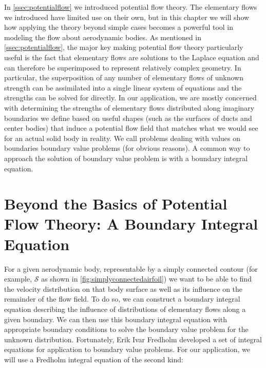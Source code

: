 
In \cref{ssec:potentialflow} we introduced potential flow theory.
%
The elementary flows we introduced have limited use on their own, but in this chapter we will show how applying the theory beyond simple cases becomes a powerful tool in modeling the flow about aerodynamic bodies.
%
As mentioned in \cref{ssec:potentialflow}, the major key making potential flow theory particularly useful is the fact that elementary flows are solutions to the Laplace equation and can therefore be superimposed to represent relatively complex geometry.
%
In particular, the superposition of any number of elementary flows of unknown strength can be assimilated into a single linear system of equations and the strengths can be solved for directly.
%
In our application, we are mostly concerned with determining the strengths of elementary flows distributed along imaginary boundaries we define based on useful shapes (such as the surfaces of ducts and center bodies) that induce a potential flow field that matches what we would see for an actual solid body in reality.
%
We call problems dealing with values on boundaries boundary value problems (for obvious reasons).
%
A common way to approach the solution of boundary value problem is with a boundary integral equation.

\section{Beyond the Basics of Potential Flow Theory: A Boundary Integral Equation}

For a given aerodynamic body, representable by a simply connected contour (for example, \(\mathcal{S}\) as shown in \cref{fig:simplyconnectedairfoil}) we want to be able to find the velocity distribution on that body surface as well as its influence on the remainder of the flow field.
%
To do so, we can construct a boundary integral equation describing the influence of distributions of elementary flows along a given boundary.
%
We can then use this boundary integral equation with appropriate boundary conditions to solve the boundary value problem for the unknown distribution.
%
Fortunately, Erik Ivar Fredholm developed a set of integral equations for application to boundary value problems.
%
For our application, we will use a Fredholm integral equation of the second kind:

